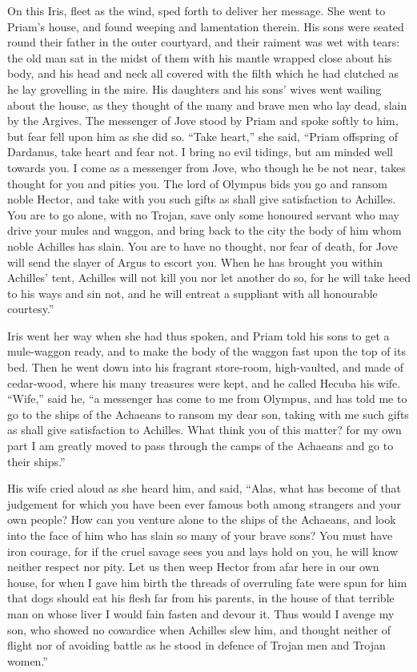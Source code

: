 On this Iris, fleet as the wind, sped forth to deliver her message. She
went to Priam’s house, and found weeping and lamentation therein. His sons
were seated round their father in the outer courtyard, and their raiment
was wet with tears: the old man sat in the midst of them with his mantle
wrapped close about his body, and his head and neck all covered with the
filth which he had clutched as he lay grovelling in the mire. His
daughters and his sons’ wives went wailing about the house, as they
thought of the many and brave men who lay dead, slain by the Argives. The
messenger of Jove stood by Priam and spoke softly to him, but fear fell
upon him as she did so. “Take heart,” she said, “Priam offspring of
Dardanus, take heart and fear not. I bring no evil tidings, but am minded
well towards you. I come as a messenger from Jove, who though he be not
near, takes thought for you and pities you. The lord of Olympus bids you
go and ransom noble Hector, and take with you such gifts as shall give
satisfaction to Achilles. You are to go alone, with no Trojan, save only
some honoured servant who may drive your mules and waggon, and bring back
to the city the body of him whom noble Achilles has slain. You are to have
no thought, nor fear of death, for Jove will send the slayer of Argus to
escort you. When he has brought you within Achilles’ tent, Achilles will
not kill you nor let another do so, for he will take heed to his ways and
sin not, and he will entreat a suppliant with all honourable courtesy.”

Iris went her way when she had thus spoken, and Priam told his sons to get
a mule-waggon ready, and to make the body of the waggon fast upon the top
of its bed. Then he went down into his fragrant store-room, high-vaulted,
and made of cedar-wood, where his many treasures were kept, and he called
Hecuba his wife. “Wife,” said he, “a messenger has come to me from
Olympus, and has told me to go to the ships of the Achaeans to ransom my
dear son, taking with me such gifts as shall give satisfaction to
Achilles. What think you of this matter? for my own part I am greatly
moved to pass through the camps of the Achaeans and go to their ships.”

His wife cried aloud as she heard him, and said, “Alas, what has become of
that judgement for which you have been ever famous both among strangers
and your own people? How can you venture alone to the ships of the
Achaeans, and look into the face of him who has slain so many of your
brave sons? You must have iron courage, for if the cruel savage sees you
and lays hold on you, he will know neither respect nor pity. Let us then
weep Hector from afar here in our own house, for when I gave him birth the
threads of overruling fate were spun for him that dogs should eat his
flesh far from his parents, in the house of that terrible man on whose
liver I would fain fasten and devour it. Thus would I avenge my son, who
showed no cowardice when Achilles slew him, and thought neither of flight
nor of avoiding battle as he stood in defence of Trojan men and Trojan
women.”


